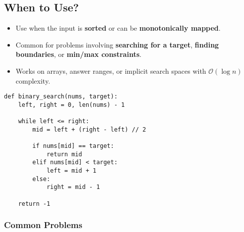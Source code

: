 \subsection{When to Use?}
\begin{summary}
    \begin{itemize}
        \item Use when the input is \textbf{sorted} or can be \textbf{monotonically mapped}.
        \item Common for problems involving \textbf{searching for a target}, \textbf{finding boundaries}, or \textbf{min/max constraints}.
        \item Works on arrays, answer ranges, or implicit search spaces with $\mathcal{O}(\log n)$ complexity.
    \end{itemize}
\end{summary}

\begin{algo}
\begin{lstlisting}
def binary_search(nums, target):
    left, right = 0, len(nums) - 1

    while left <= right:
        mid = left + (right - left) // 2

        if nums[mid] == target:
            return mid
        elif nums[mid] < target:
            left = mid + 1
        else:
            right = mid - 1

    return -1
\end{lstlisting}
\end{algo}

\newpage

\subsubsection{Common Problems}
\begin{summary}
\end{summary}
